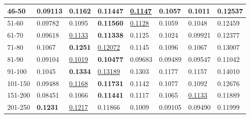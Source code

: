 \begin{table*}[]
\begin{tabular}{|l|l|l|l|l|l|l||l|}
        46-50       & 0.09113                        & \textbf{0.1162}                & 0.11447                        & \underline{0.1147}             & 0.1057                         & 0.1011                          & 0.12537                    \\ \hline
        51-60       & 0.09782                        & 0.1095                         & \textbf{0.11560}               & \underline{0.1128}             & 0.1059                         & 0.1048                          & 0.12459                    \\ \hline
        61-70       & 0.09618                        & \underline{0.1133}             & \textbf{0.11338}               & 0.1125                         & 0.1024                         & 0.09921                         & 0.12377                    \\ \hline
        71-80       & 0.1067                         & \textbf{0.1251}                & \underline{0.12072}            & 0.1145                         & 0.1096                         & 0.1067                          & 0.13007                    \\ \hline
        81-90       & 0.09104                        & \underline{0.1019}             & \textbf{0.10477}               & 0.09683                        & 0.09489                        & 0.09547                         & 0.11042                    \\ \hline
        91-100      & 0.1045                         & \textbf{0.1334}                & \underline{0.13189}            & 0.1303                         & 0.1177                         & 0.1157                          & 0.14010                    \\ \hline
        101-150     & 0.09488                        & \underline{0.1168}             & \textbf{0.11731}               & 0.1142                         & 0.1077                         & 0.1092                          & 0.12676                    \\ \hline
        151-200     & 0.08451                        & 0.1066                         & \textbf{0.11441}               & 0.1117                         & 0.1065                         & \underline{0.1133}              & 0.11889                    \\ \hline
        201-250     & \textbf{0.1231}                & \underline{0.1217}             & 0.11866                        & 0.1009                         & 0.09105                        & 0.09490                         & 0.11999                    \\ \hline

\end{tabular}
\end{table*}

